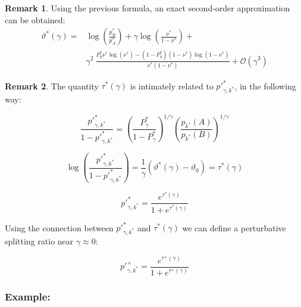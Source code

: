 \documentclass{article}
\theoremstyle{definition}
\newtheorem*{remark}{Remark}
\begin{document}
\begin{remark}
    Using the previous formula, an exact second-order approximation can be obtained:
    \begin{equation}
        \begin{split}
            \vartheta^*(\gamma) =& \log \left ( \frac{p^*_B}{p^*_A} \right ) + \gamma \log \left ( \frac{\nu^*}{1-\nu^*} \right ) + \\ 
            & \gamma^2 \ \frac{P^*_0 \nu^* \log(\nu^*) - (1-P^*_0) (1-\nu^*) \log(1-\nu^*)}{ \nu^* (1-\nu^*)}+
            \mathcal{O}(\gamma^3)
        \end{split}
    \end{equation}
    
\end{remark}

\begin{remark}
    The quantity $\tau^*(\gamma)$ is intimately related to $p'^*_{\gamma,k^*}$, in the following way:

    \begin{equation}
        \frac{p'^*_{\gamma,k^*}}{1-p'^*_{\gamma,k^*}} = 
        \left ( \frac{P^*_\gamma}{1-P^*_\gamma} \right )^{1/\gamma}
        \left ( \frac{p_{k^*}(A)}{p_{k^*}(B)} \right )^{1/\gamma}
    \end{equation}

    \begin{equation}
        \log \left ( \frac{p'^*_{\gamma,k^*}}{1-p'^*_{\gamma,k^*}} \right ) = 
        \frac{1}{\gamma} \left ( \vartheta^*(\gamma) - \vartheta_0 \right ) = 
        \tau^*(\gamma)
    \end{equation}

    \begin{equation}
        p'^*_{\gamma,k^*} = \frac{e^{\tau^*(\gamma)}}{1+e^{\tau^*(\gamma)}}
    \end{equation}
    
\end{remark}

Using the connection between $p'^*_{\gamma,k^*}$ and $\tau^*(\gamma)$ we can define a perturbative splitting ratio near $\gamma \approx 0$:

\begin{equation}
    p'^\times_{\gamma,k^*} = \frac{e^{\tau^\times(\gamma)}}{1+e^{\tau^\times(\gamma)}}
\end{equation}

\subsubsection{Example:}
\end{document}
